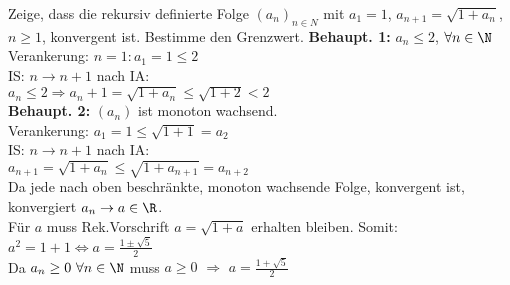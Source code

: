 \begin{example}
    Zeige, dass die rekursiv definierte Folge $(a_n)_{n \in N}$ mit $a_1 = 1$, $a_{n+1} = \sqrt{1 + a_n}$, $n\geq 1$, konvergent ist. Bestimme den Grenzwert.
    \tcblower
    \textbf{Behaupt. 1:} $a_n \leq 2$, $\forall n \in \N$\\
    Verankerung: $n = 1: a_1 = 1 \leq 2$\\
    IS: $n \to n+1$ nach IA:\\
    $a_n \leq 2 \Rightarrow a_n + 1 = \sqrt{1 + a_n} \leq \sqrt{1 + 2} < 2$\\
    \textbf{Behaupt. 2:} $(a_n)$ ist monoton wachsend.\\
    Verankerung: $a_1 = 1 \leq \sqrt{1 + 1} = a_2$\\
    IS: $n \to n+1$ nach IA:\\
    $a_{n+1} = \sqrt{1 + a_n} \leq \sqrt{1 + a_{n+1}} = a_{n+2}$\\
    Da jede nach oben beschränkte, monoton wachsende Folge, konvergent ist, konvergiert $a_n \to a \in \R$.\\
    Für $a$ muss Rek.Vorschrift $a = \sqrt{1 + a}$ erhalten bleiben. Somit:\\
    $a^2 = 1 + 1 \Leftrightarrow a = \frac{1 \pm \sqrt{5}}{2}$\\
    Da $a_n \geq 0 ~\forall n \in \N$ muss $a \geq 0$ $\Rightarrow$ $a = \frac{1 + \sqrt{5}}{2}$
\end{example}